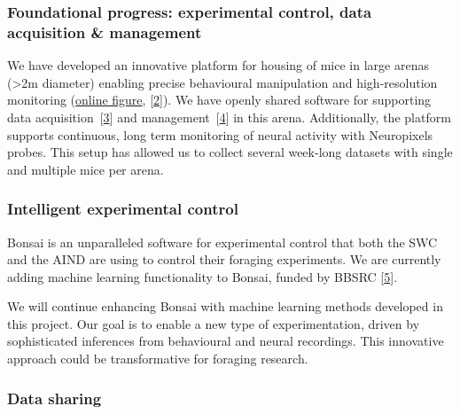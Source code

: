 \subsubsection{Foundational progress: experimental control, data acquisition \& management}

We have developed an innovative platform for housing of mice in large arenas
(\textgreater 2m diameter) enabling precise behavioural manipulation and
high-resolution monitoring
(\href{https://www.gatsby.ucl.ac.uk/~rapela/bbsrc\_nsfbio/figures/foragingArena.png}{online
figure},
[\href{https://www.abstractsonline.com/pp8/?_gl=1*it0gi6*_gcl_au*MTUyNDE0NDQwLjE3Mjc2OTgyODM.*_ga*MTUxNDI2NDg5LjE3Mjc2OTgyODM.*_ga_T09K3Q2WDN*MTcyOTUwNDUzNy4yLjEuMTcyOTUwNDY3Ny41NC4wLjA.#!/20433/presentation/22271}{2}]).
%
We have openly shared software for supporting data
acquisition~[\href{https://github.com/SainsburyWellcomeCentre/aeon_acquisition}{3}]
and
management~[\href{https://github.com/SainsburyWellcomeCentre/aeon_mecha}{4}] in this
arena.
%
Additionally, the platform supports continuous, long term monitoring of neural
activity with Neuropixels probes.
%
This setup has allowed us to collect several week-long datasets with single and
multiple mice per arena.


\subsubsection{Intelligent experimental control}

Bonsai is an unparalleled software for experimental control that both the SWC
and the AIND are using to control their foraging experiments.
%
We are currently adding machine learning functionality to Bonsai, funded by
BBSRC
[\href{https://gow.bbsrc.ukri.org/grants/AwardDetails.aspx?FundingReference=BB\%2FW019132\%2F1}{5}].

We will continue enhancing Bonsai with machine learning methods developed in
this project.
%
Our goal is to enable a new type of experimentation, driven by sophisticated
inferences from behavioural and neural recordings. This innovative approach
could be transformative for foraging research.

%

\subsubsection{Data sharing}


